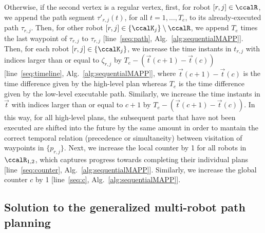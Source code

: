 \documentclass[journal]{IEEEtran}
\begin{document}
{{    

    Otherwise, if the second vertex is a regular vertex, first, for robot $[r, j] \in \ccalR$, we append the path segment $\tau'_{r,j}(t)$, for all $t=1,\ldots, T_e$, to its already-executed path $\tau_{r,j}$. Then, for other robot $[r,j] \in \{\ccalK_j\}\setminus \ccalR$, we  append  $T_e$ times the last waypoint of  $\tau_{r,j}$  to $\tau_{r,j}$ [line~\ref{seq:path}, Alg.~\ref{alg:sequentialMAPP}]. Then, for each robot $[r,j] \in \{\ccalK_j\}$, we increase the time instants in $t_{r,j}$ with indices larger than or equal to  $\zeta_{r,j}$ by $T_e - (\vec{t}(c+1) - \vec{t}(c))$ [line~\ref{seq:timeline}, Alg.~\ref{alg:sequentialMAPP}], where $\vec{t}(c+1) - \vec{t}(c)$ is the time difference given by the high-level plan whereas $T_e$ is the time difference given by the low-level executable path.
    Similarly, we increase the time instants in $\vec{t}$ with indices larger than or equal to  $c+1$ by $T_e - (\vec{t}(c+1)- \vec{t}(c))$.
    In this way, for all high-level plans, the subsequent parts that have not been executed are shifted into the future by the same amount in order to mantain the correct temporal relation (precedence or simultaneity) between visitation of waypoints in $\{p_{r,j}\}$. Next, we increase  the local counter by 1 for all robots in $\ccalR_{1,2}$, which captures progress towards completing their individual plans [line~\ref{seq:counter}, Alg.~\ref{alg:sequentialMAPP}]. Similarly, we increase the global counter $c$ by 1 [line~\ref{seq:c}, Alg.~\ref{alg:sequentialMAPP}].}
}


\subsection{Solution to the generalized multi-robot path planning}\label{sec:solution2mapp}
\end{document}
